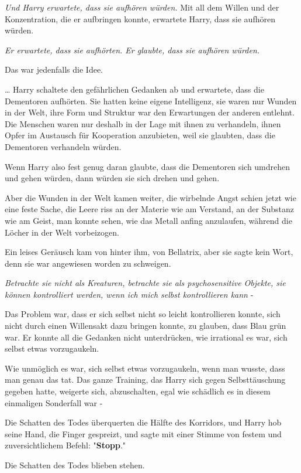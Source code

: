 {\emph{Und Harry erwartete, dass sie aufhören würden.} Mit all dem Willen und der Konzentration, die er aufbringen konnte, erwartete Harry, dass sie aufhören würden.

\emph{Er erwartete, dass sie aufhörten. Er glaubte, dass sie aufhören würden.}

Das war jedenfalls die Idee.

… Harry schaltete den gefährlichen Gedanken ab und erwartete, dass die Dementoren aufhörten. Sie hatten keine eigene Intelligenz, sie waren nur Wunden in der Welt, ihre Form und Struktur war den Erwartungen der anderen entlehnt. Die Menschen waren nur deshalb in der Lage mit ihnen zu verhandeln, ihnen Opfer im Austausch für Kooperation anzubieten, weil sie glaubten, dass die Dementoren verhandeln würden.

Wenn Harry also fest genug daran glaubte, dass die Dementoren sich umdrehen und gehen würden, dann würden sie sich drehen und gehen.

Aber die Wunden in der Welt kamen weiter, die wirbelnde Angst schien jetzt wie eine feste Sache, die Leere riss an der Materie wie am Verstand, an der Substanz wie am Geist, man konnte sehen, wie das Metall anfing anzulaufen, während die Löcher in der Welt vorbeizogen.

Ein leises Geräusch kam von hinter ihm, von Bellatrix, aber sie sagte kein Wort, denn sie war angewiesen worden zu schweigen.

\emph{Betrachte sie nicht als Kreaturen, betrachte sie als psychosensitive Objekte, sie können kontrolliert werden, wenn ich mich selbst kontrollieren kann} -

Das Problem war, dass er sich selbst nicht so leicht kontrollieren konnte, sich nicht durch einen Willensakt dazu bringen konnte, zu glauben, dass Blau grün war. Er konnte all die Gedanken nicht unterdrücken, wie irrational es war, sich selbst etwas vorzugaukeln.

Wie unmöglich es war, sich selbst etwas vorzugaukeln, wenn man wusste, dass man genau das tat. Das ganze Training, das Harry sich gegen Selbsttäuschung gegeben hatte, weigerte sich, abzuschalten, egal wie schädlich es in diesem einmaligen Sonderfall war -

Die Schatten des Todes überquerten die Hälfte des Korridors, und Harry hob seine Hand, die Finger gespreizt, und sagte mit einer Stimme von festem und zuversichtlichem Befehl: "\textbf{Stopp}."

Die Schatten des Todes blieben stehen.

}
